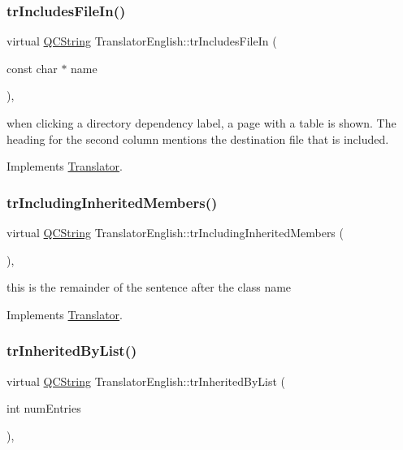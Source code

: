 \subsubsection{\texorpdfstring{trIncludesFileIn()}{trIncludesFileIn()}}
{\footnotesize\ttfamily virtual \mbox{\hyperlink{class_q_c_string}{Q\+C\+String}} Translator\+English\+::tr\+Includes\+File\+In (\begin{DoxyParamCaption}\item[{const char $\ast$}]{name }\end{DoxyParamCaption})\hspace{0.3cm}{\ttfamily [inline]}, {\ttfamily [virtual]}}

when clicking a directory dependency label, a page with a table is shown. The heading for the second column mentions the destination file that is included. 

Implements \mbox{\hyperlink{class_translator}{Translator}}.

\mbox{\label{class_translator_english_aa4fde879e1f4400ffc31f1ed8ed1bf97}} 
\subsubsection{\texorpdfstring{trIncludingInheritedMembers()}{trIncludingInheritedMembers()}}
{\footnotesize\ttfamily virtual \mbox{\hyperlink{class_q_c_string}{Q\+C\+String}} Translator\+English\+::tr\+Including\+Inherited\+Members (\begin{DoxyParamCaption}{ }\end{DoxyParamCaption})\hspace{0.3cm}{\ttfamily [inline]}, {\ttfamily [virtual]}}

this is the remainder of the sentence after the class name 

Implements \mbox{\hyperlink{class_translator}{Translator}}.

\mbox{\label{class_translator_english_afd5f9f2060afb25620ab0291203b887a}} 
\subsubsection{\texorpdfstring{trInheritedByList()}{trInheritedByList()}}
{\footnotesize\ttfamily virtual \mbox{\hyperlink{class_q_c_string}{Q\+C\+String}} Translator\+English\+::tr\+Inherited\+By\+List (\begin{DoxyParamCaption}\item[{int}]{num\+Entries }\end{DoxyParamCaption})\hspace{0.3cm}{\ttfamily [inline]}, {\ttfamily [virtual]}}

